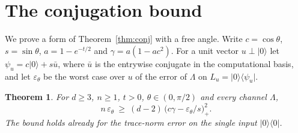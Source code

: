 \documentclass[11pt]{article}
\newtheorem{theorem}{Theorem}
\theoremstyle{remark}
\newcommand{\ket}[1]{\lvert #1 \rangle}
\newcommand{\bra}[1]{\langle #1 \rvert}
\newcommand{\proj}[1]{\lvert #1 \rangle\langle #1 \rvert}
\begin{document}
\section{The conjugation bound}\label{sec:conj}

We prove a form of Theorem~\ref{thm:conj} with a free angle. Write $c = \cos\theta$, $s = \sin\theta$, $a = 1 - e^{-t/2}$ and $\gamma = a(1 - ac^2)$. For a unit vector $u \perp \ket{0}$ let $\psi_u = c\ket{0} + s\bar u$, where $\bar u$ is the entrywise conjugate in the computational basis, and let $\varepsilon_\theta$ be the worst case over $u$ of the error of $\Lambda$ on $L_u = \ket{0}\bra{\psi_u}$.

\begin{theorem}\label{thm:conjtheta}
For $d \ge 3$, $n \ge 1$, $t > 0$, $\theta \in (0, \pi/2)$ and every channel $\Lambda$,
\[
n\,\varepsilon_\theta \ \ge\ (d-2)\,\bigl(c\gamma - \varepsilon_\theta/s\bigr)_+^2 .
\]
The bound holds already for the trace-norm error on the single input $\proj{0}$.
\end{theorem}
\end{document}
